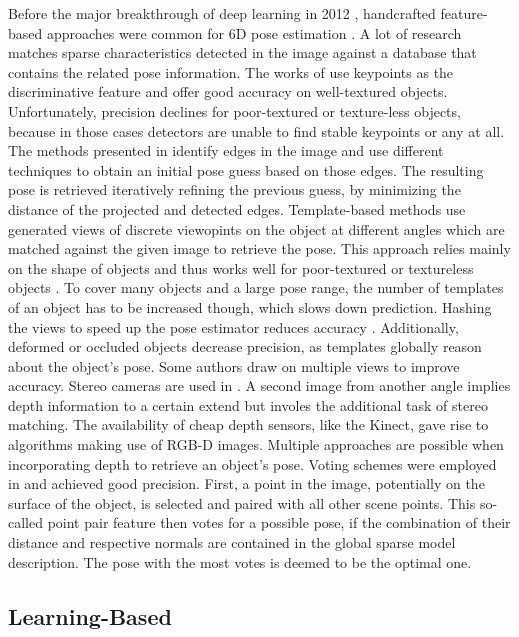 Before the major breakthrough of deep learning in 2012 \cite{alexnet}, handcrafted feature-based approaches were common for 6D pose estimation \cite{ylecun}. A lot of research matches sparse characteristics detected in the image against a database that contains the related pose information. The works of \cite{dglowe1, dwagner} use keypoints as the discriminative feature and offer good accuracy on well-textured objects. Unfortunately, precision declines for poor-textured or texture-less objects, because in those cases detectors are unable to find stable keypoints or any at all. The methods presented in \cite{gklein,dglowe2,charris} identify edges in the image and use different techniques to obtain an initial pose guess based on those edges. The resulting pose is retrieved iteratively refining the previous guess, by minimizing the distance of the projected and detected edges.
\nnewline
Template-based methods \cite{hinterstoisser1, hinterstoisser2, rioscabrera, csteger} use generated views of discrete viewopints on the object at different angles which are matched against the given image to retrieve the pose. This approach relies mainly on the shape of objects and thus works well for poor-textured or textureless objects \cite{pertsch}. To cover many objects and a large pose range, the number of templates of an object has to be increased though, which slows down prediction. Hashing the views to speed up the pose estimator reduces accuracy \cite{zhou}. Additionally, deformed or occluded objects decrease precision, as templates globally reason about the object's pose.
\nnewline
Some authors draw on multiple views to improve accuracy. Stereo cameras are used in \cite{kpauwels}. A second image from another angle implies depth information to a certain extend but involes the additional task of stereo matching. The availability of cheap depth sensors, like the Kinect, gave rise to algorithms making use of RGB-D images. Multiple approaches are possible when incorporating depth to retrieve an object's pose. Voting schemes were employed in \cite{bdrost, salasmoreno} and achieved good precision. First, a point in the image, potentially on the surface of the object, is selected and paired with all other scene points. This so-called point pair feature then votes for a possible pose, if the combination of their distance and respective normals are contained in the global sparse model description. The pose with the most votes is deemed to be the optimal one.

\subsection{Learning-Based}

